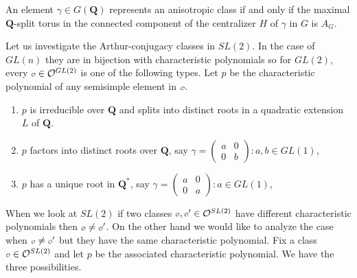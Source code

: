 \documentclass{ims9x6}
\def\Q{\mathbf Q}
\def\O{\mathcal O}
\def\o{\scalebox{0.7}{$\scriptstyle\mathcal{O}$}}
\begin{document}
\begin{lemma}
	An element $\gamma \in G(\Q)$ represents an anisotropic class if and only if the maximal $\Q$-split torus in the connected component of the centralizer $H$ of $\gamma$ in $G$ is $A_G$. 
\end{lemma}

Let us investigate the Arthur-conjugacy classes in $SL(2)$. In the case of $GL(n)$ they are in bijection with characteristic polynomials so for $GL(2)$, every $\o \in \O^{GL(2)}$ is one of the following types. Let $p$ be the characteristic polynomial of any semisimple element in $\o$. 
\begin{enumerate}
	\item $p$ is irreducible over $\Q$ and splits into distinct roots in a quadratic extension $L$ of $\Q$.
	\item $p$ factors into distinct roots over $\Q$, say $\gamma = \begin{pmatrix} a & 0 \\ 0 & b \end{pmatrix}: 
			a, b \in GL(1)$,
	\item $p$ has a unique root in $\Q^*$, say $\gamma = \begin{pmatrix} a & 0 \\ 0 & a \end{pmatrix}: a \in GL(1)$,
\end{enumerate}
When we look at $SL(2)$ if two classes $\o, \o' \in \O^{SL(2)}$ have different characteristic polynomials then $\o \neq \o'$. On the other hand we would like to analyze the case when $\o \neq \o'$ but they have the same characteristic polynomial. Fix a class $\o \in \O^{SL(2)}$ and let $p$ be the associated characteristic polynomial. We have the three possibilities. 
\end{document}
